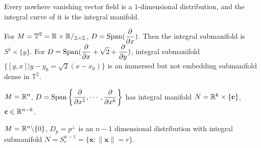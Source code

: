 \begin{example}
    Every nowhere vanishing vector field is a  $ 1 $-dimensional distribution,  and the integral curve of it is the integral manifold.
\end{example}

\begin{example}
    For  $ \displaystyle M=\mathbb{T}^2=\mathbb R\times\mathbb R/_{\mathbb Z\times \mathbb Z} $,  $ D=\displaystyle\mathrm{Span}(\frac{\partial}{\partial x}) $. Then the integral submanifold is  $ S^1\times\{y\} $. For  $ D=\displaystyle\mathrm{Span}(\frac{\partial }{\partial x}+\sqrt{2}+\frac{\partial }{\partial y}) $, integral submanifold  $ \{[y,x]|y-y_0=\sqrt{2}(x-x_0)\} $ is an immersed but not embedding submanifold dense in  $ \mathbb T^2 $. 
\end{example}
\begin{example}
     $ M=\mathbb R^n  $, $ D=\mathrm{Span}\left\{\displaystyle\frac{\partial }{\partial x^1},\cdots,\frac{\partial }{\partial x^k}\right\} $ has integral manifold  $ N=\mathbb R^k\times\{\textbf{c}\} $,  $ \textbf{c}\in \mathbb R^{n-k} $.  
\end{example}

\begin{example}
     $ M=\mathbb R^n\backslash\{0\} $,  $ D_p=p^\perp $  is an  $ n-1 $  dimensional distribution with integral submanifold  $ N=S_r^{n-1}=\{\textbf{x}:\|\textbf{x}\|=r\} $.
\end{example}

